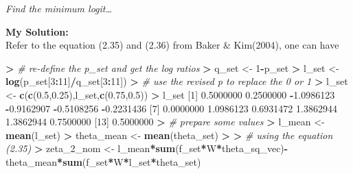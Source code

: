 \documentclass[
]{article}
\newenvironment{Shaded}{\begin{snugshade}}{\end{snugshade}}
\newcommand{\CommentTok}[1]{\textcolor[rgb]{0.56,0.35,0.01}{\textit{#1}}}
\newcommand{\DecValTok}[1]{\textcolor[rgb]{0.00,0.00,0.81}{#1}}
\newcommand{\ErrorTok}[1]{\textcolor[rgb]{0.64,0.00,0.00}{\textbf{#1}}}
\newcommand{\FloatTok}[1]{\textcolor[rgb]{0.00,0.00,0.81}{#1}}
\newcommand{\FunctionTok}[1]{\textcolor[rgb]{0.13,0.29,0.53}{\textbf{#1}}}
\newcommand{\NormalTok}[1]{#1}
\newcommand{\OtherTok}[1]{\textcolor[rgb]{0.56,0.35,0.01}{#1}}
\newcommand{\SpecialCharTok}[1]{\textcolor[rgb]{0.81,0.36,0.00}{\textbf{#1}}}
\begin{document}
\emph{Find the minimum logit\ldots{}}

\textbf{My Solution: }\\
Refer to the equation (2.35) and (2.36) from Baker \& Kim(2004), one can
have

\begin{Shaded}
\begin{Highlighting}[]
\SpecialCharTok{\textgreater{}} \CommentTok{\# re{-}define the p\_set and get the log ratios}
\ErrorTok{\textgreater{}}\NormalTok{ q\_set }\OtherTok{\textless{}{-}} \DecValTok{1}\SpecialCharTok{{-}}\NormalTok{p\_set}
\SpecialCharTok{\textgreater{}}\NormalTok{ l\_set }\OtherTok{\textless{}{-}} \FunctionTok{log}\NormalTok{(p\_set[}\DecValTok{3}\SpecialCharTok{:}\DecValTok{11}\NormalTok{]}\SpecialCharTok{/}\NormalTok{q\_set[}\DecValTok{3}\SpecialCharTok{:}\DecValTok{11}\NormalTok{])}
\SpecialCharTok{\textgreater{}} \CommentTok{\# use the revised p to replace the 0 or 1}
\ErrorTok{\textgreater{}}\NormalTok{ l\_set }\OtherTok{\textless{}{-}} \FunctionTok{c}\NormalTok{(}\FunctionTok{c}\NormalTok{(}\FloatTok{0.5}\NormalTok{,}\FloatTok{0.25}\NormalTok{),l\_set,}\FunctionTok{c}\NormalTok{(}\FloatTok{0.75}\NormalTok{,}\FloatTok{0.5}\NormalTok{))}
\SpecialCharTok{\textgreater{}}\NormalTok{ l\_set}
\NormalTok{ [}\DecValTok{1}\NormalTok{]  }\FloatTok{0.5000000}  \FloatTok{0.2500000} \SpecialCharTok{{-}}\FloatTok{1.0986123} \SpecialCharTok{{-}}\FloatTok{0.9162907} \SpecialCharTok{{-}}\FloatTok{0.5108256} \SpecialCharTok{{-}}\FloatTok{0.2231436}
\NormalTok{ [}\DecValTok{7}\NormalTok{]  }\FloatTok{0.0000000}  \FloatTok{1.0986123}  \FloatTok{0.6931472}  \FloatTok{1.3862944}  \FloatTok{1.3862944}  \FloatTok{0.7500000}
\NormalTok{[}\DecValTok{13}\NormalTok{]  }\FloatTok{0.5000000}
\SpecialCharTok{\textgreater{}} \CommentTok{\# prepare some values}
\ErrorTok{\textgreater{}}\NormalTok{ l\_mean }\OtherTok{\textless{}{-}} \FunctionTok{mean}\NormalTok{(l\_set)}
\SpecialCharTok{\textgreater{}}\NormalTok{ theta\_mean }\OtherTok{\textless{}{-}} \FunctionTok{mean}\NormalTok{(theta\_set)}
\SpecialCharTok{\textgreater{}} 
\ErrorTok{\textgreater{}} \CommentTok{\# using the equation (2.35)}
\ErrorTok{\textgreater{}}\NormalTok{ zeta\_2\_nom }\OtherTok{\textless{}{-}}\NormalTok{ l\_mean}\SpecialCharTok{*}\FunctionTok{sum}\NormalTok{(f\_set}\SpecialCharTok{*}\NormalTok{W}\SpecialCharTok{*}\NormalTok{theta\_sq\_vec)}\SpecialCharTok{{-}}\NormalTok{theta\_mean}\SpecialCharTok{*}\FunctionTok{sum}\NormalTok{(f\_set}\SpecialCharTok{*}\NormalTok{W}\SpecialCharTok{*}\NormalTok{l\_set}\SpecialCharTok{*}\NormalTok{theta\_set)}

\end{Highlighting}
\end{Shaded}
\end{document}
